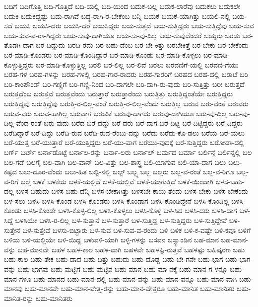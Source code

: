 {ಬದಿಗೆ
ಬದಿಗೊತ್ತಿ
ಬದಿ-ಗೊತ್ತಿದೆ
ಬದಿ-ಯಲ್ಲಿ
ಬದಿ-ಯಿಂದ
ಬದುಕ-ಬಲ್ಲ
ಬದುಕ-ಲಾರೆವು
ಬದುಕಲು
ಬದುಕಲೇ
ಬದುಕಿ
ಬದುಕಿದ್ದಷ್ಟು
ಬದು-ರಾಗಿವೆ
ಬದ್ಧ-ರಾಗಿ-ರ-ಬೇಕೆಂಬ
ಬನ್ನಿ
ಬಯಕೆ
ಬಯಕೆ-ಯಾಗಿತ್ತು
ಬಯಲಿ-ನಲ್ಲಿ
ಬಯ-ಸದೆ
ಬಯಸಿ
ಬಯಸಿ-ದರು
ಬಯಸಿ-ದರೆ
ಬಯಸಿದ್ದರು
ಬಯ-ಸುತ್ತದೆ
ಬಯ-ಸುತ್ತಿದ್ದರು
ಬಯ-ಸುತ್ತಿದ್ದೆವು
ಬಯ-ಸುವ
ಬಯ-ಸುವ-ವ-ರಾ-ಗಿದ್ದರು
ಬಯ-ಸುವು-ದಾಗಿಯೂ
ಬಯ-ಸು-ವು-ದಿಲ್ಲ
ಬಯ-ಸುವುದೆಂದರೆ
ಬಯ್ದರು
ಬರಡು
ಬರ-ತೊಡಗಿ-ದಾಗ
ಬರ-ದಿದ್ದುದು
ಬರದಿ-ರದು
ಬರ-ಬಹು-ದೆಂಬ
ಬರ-ಬೇ-ಕಿತ್ತು
ಬರಬೇಕಿತ್ತೆ
ಬರ-ಬೇಕು
ಬರ-ಬೇಕೆಂದು
ಬರ-ಮಾಡಿ-ಕೊಂಡರು
ಬರ-ಮಾಡಿ-ಕೊಂಡಿದ್ದಾರೆ
ಬರ-ಮಾಡಿ-ಕೊಂಡು
ಬರ-ಮಾಡಿ-ಕೊಳ್ಳಲು
ಬರ-ಮಾಡಿ-ಕೊಳ್ಳುತ್ತಿದ್ದರು
ಬರ-ಮಾಡಿ-ಕೊಳ್ಳುತ್ತಿಲ್ಲ
ಬರಲಿ
ಬರ-ಲಿಲ್ಲ
ಬರ-ಲಿವೆ
ಬರಲು
ಬರವಣಿಗೆ-ಯಲ್ಲಿ
ಬರವಣಿ-ಗೆಯು
ಬರಹ-ಗಳ
ಬರಹ-ಗಳನ್ನು
ಬರಹ-ಗಳಲ್ಲಿ
ಬರಹ-ಗಾರ-ರಾದರು
ಬರಹ-ಗಾರರಿಗೆ
ಬರಹದ
ಬರಹ-ದಲ್ಲಿ
ಬರಾಟೆ
ಬರಿ
ಬರಿ-ಕಾಂಪೌಂಡ್
ಬರಿ-ಗಣ್ಣಿಗೆ
ಬರಿ-ಗಣ್ಣಿ-ನಿಂದ
ಬರಿ-ದಾಗಲೇ
ಬರಿ-ದಾಗಿ-ರು-ವುದು
ಬರಿ-ಸುತ್ತಿತ್ತು
ಬರೀ
ಬರುತ್ತದೆ
ಬರುತ್ತದೆಂಬ
ಬರುತ್ತವೆ
ಬರುತ್ತವೆಂದು
ಬರುತ್ತಾರೆ
ಬರುತ್ತಾರೆಂದು
ಬರುತ್ತಿತ್ತು
ಬರುತ್ತಿದ್ದಂತೆಯೇ
ಬರುತ್ತಿದ್ದರು
ಬರುತ್ತಿದ್ದವು
ಬರುತ್ತಿದ್ದೆವು
ಬರುತ್ತಿ-ರ-ಲಿಲ್ಲ-ವಂತೆ
ಬರುತ್ತಿ-ರ-ಲಿಲ್ಲ-ವೆಂದು
ಬರುತ್ತಿಲ್ಲ
ಬರುವ
ಬರು-ವಂತೆ
ಬರುವರು
ಬರುವ-ವರು
ಬರುವ-ಹಾಗಿಲ್ಲ
ಬರುವಾಗ
ಬರುವಿಕೆ
ಬರುವು-ದಾಗದು
ಬರುವು-ದಾಗಿಯೂ
ಬರು-ವು-ದಿಲ್ಲ
ಬರು-ವು-ದಿಲ್ಲ-ವೆಂದ-ರಂತೆ
ಬರು-ವುದು
ಬರೆದ
ಬರೆ-ದದ್ದು
ಬರೆ-ದರು
ಬರೆ-ದಾಗ
ಬರೆ-ದಿಟ್ಟ
ಬರೆ-ದಿಟ್ಟಿದ್ದರು
ಬರೆ-ದಿದ್ದರು
ಬರೆದಿದ್ದಾರೆ
ಬರೆ-ದಿದ್ದು
ಬರೆದಿ-ರುವ
ಬರೆದಿ-ರುವ-ರೆಂಬು-ದನ್ನು
ಬರೆದು
ಬರೆದು-ಕೊ-ಡಲು
ಬರೆಯ
ಬರೆ-ಯಲು
ಬರೆ-ಯುತ್ತ
ಬರೆ-ಯುತ್ತಾರೆ
ಬರೆ-ಯುತ್ತಿದ್ದರು
ಬರೆ-ಯು-ವಾಗ
ಬರೆಯು-ವುದಕ್ಕೆ
ಬರೆ-ಸುತ್ತಿದ್ದರು
ಬರೋಡಾ-ದಲ್ಲಿ
ಬರ್ಗ್
ಬರ್ಟ್
ಬರ್ನಾಡೊಟ್ಟೆ
ಬರ್ನಾಲ-ರನ್ನು
ಬರ್ನಾ-ಲರು
ಬರ್ನಾಲ್
ಬರ್ಮದ
ಬರ್ಮಾ
ಬರ್ಲಿನ್ಗೆ
ಬರ್ಲಿನ್ನಲ್ಲಿ
ಬಲ
ಬಲ-ಗಡೆ
ಬಲಗೈ
ಬಲ-ವಾಗಿ
ಬಲ-ವಾನ್
ಬಲ-ವಿತ್ತು
ಬಲ-ಶಾಸ್ತ್ರ
ಬಲಿ-ಯಾಗುವ
ಬಲಿ-ಯಾ-ದಾಗ
ಬಲು
ಬಲು-ಕಷ್ಟದ
ಬಲು-ದೂರ-ವೆಂದು
ಬಲು-ಹಿತ
ಬಲ್ಬಿ-ನಲ್ಲಿ
ಬಲ್ಬ್
ಬಲ್ಬ್ನ
ಬಲ್ಲ
ಬಲ್ಲರು
ಬಲ್ಲ-ವ-ರಂತೆ
ಬಲ್ಲ-ವ-ರಿಗೂ
ಬಲ್ಲ-ವ-ರಿಗೆ
ಬಲ್ಲೆ
ಬಳಕೆ
ಬಳಕೆಯ
ಬಳಕೆ-ಯಲ್ಲಿದೆ
ಬಳಕೆ-ಯಲ್ಲಿವೆ
ಬಳಕೆ-ಯಾಗುತ್ತಿದೆ
ಬಳಕೆ-ಯಿಂದಾಗಿ
ಬಳಸ-ಬಹು-ದಲ್ಲ
ಬಳಸ-ಬಹುದು
ಬಳಸ-ಬಹು-ದೆನ್ನಿ
ಬಳಸ-ಬೇಕಾಗಿತ್ತು
ಬಳಸಬೇ-ಕಾಯಿ-ತೆಂದು
ಬಳಸ-ಬೇಕು
ಬಳಸ-ಬೇಕೆಂದು
ಬಳ-ಸಲು
ಬಳಸಿ
ಬಳಸಿ-ಕೊಂಡ
ಬಳಸಿ-ಕೊಂಡರು
ಬಳಸಿ-ಕೊಂಡಾಗ
ಬಳಸಿ-ಕೊಂಡಿದ್ದೇನೆ
ಬಳಸಿ-ಕೊಂಡಿಲ್ಲ
ಬಳಸಿ-ಕೊಂಡು
ಬಳಸಿ-ಕೊಂಡೇ
ಬಳಸಿ-ಕೊಳ್ಳ-ಲಿಲ್ಲ
ಬಳಸಿ-ಕೊಳ್ಳಲು
ಬಳಸಿ-ಕೊಳ್ಳಿ
ಬಳ-ಸಿದ
ಬಳಸಿ-ದರು
ಬಳಸಿ-ದಾಗ
ಬಳ-ಸಿದ್ದೆ
ಬಳಸಿಯೇ
ಬಳಸಿ-ರ-ಲಿಲ್ಲ
ಬಳ-ಸುತ್ತಾನೆ
ಬಳ-ಸುತ್ತಾರೆ
ಬಳ-ಸುತ್ತಿದ್ದ
ಬಳ-ಸುತ್ತಿದ್ದರು
ಬಳ-ಸುತ್ತಿದ್ದೇವೆ
ಬಳ-ಸುತ್ತೇನೆ
ಬಳ-ಸುತ್ತೇವೆ
ಬಳಸು-ಬಿಟ್ಟಾರು
ಬಳ-ಸುವ
ಬಳ-ಸುವ-ವ-ರೆಂದು
ಬಳಿ
ಬಳಿಕ
ಬಳಿ-ಕ-ವಷ್ಟೇ
ಬಳಿ-ಕವೂ
ಬಳಿಗೆ
ಬಳಿಯ
ಬಳಿ-ಯಲ್ಲಿಯೇ
ಬಳಿ-ಯಿದ್ದ
ಬಳುವಳಿ-ಯಾಗಿ
ಬಳ್ಳಿ-ಗಳನ್ನು
ಬಸವನ
ಬಸ್ಸ್ಟಾಂಡಿನ
ಬಹ-ಮಾನ
ಬಹ-ಮಾನ-ವನ್ನು
ಬಹ-ಮಾನವೇ
ಬಹಳ
ಬಹಳ-ಕಾಲ
ಬಹಳ-ವಾಗಿ
ಬಹಳವೇ
ಬಹಳಷ್ಟಿ-ರುತ್ತವೆ
ಬಹಳಷ್ಟು
ಬಹಿಷ್ಕರಣ
ಬಹು
ಬಹು-ಕಾಲ
ಬಹು-ತೇಕ
ಬಹು-ದಾದ
ಬಹು-ದಿತ್ತು
ಬಹುದು
ಬಹು-ದೊಡ್ಡ
ಬಹು-ಬೇ-ಗನೇ
ಬಹು-ಭಾಗ
ಬಹು-ಭಾಗ-ವನ್ನು
ಬಹು-ಭಾಗವು
ಬಹು-ಮಟ್ಟಿಗೆ
ಬಹು-ಮಟ್ಟಿನ
ಬಹು-ಮಾನ
ಬಹು-ಮಾ-ನಕ್ಕೆ
ಬಹು-ಮಾನ-ಗ-ಳನ್ನೂ
ಬಹು-ಮಾನ-ಗಳೂ
ಬಹು-ಮಾನದ
ಬಹು-ಮಾನ-ದಲ್ಲಿ
ಬಹು-ಮಾನ-ವನ್ನು
ಬಹು-ಮಾನ-ವನ್ನೂ
ಬಹು-ಮಾನ-ವಾಗಿ
ಬಹು-ಮಾನವು
ಬಹು-ಮಾನವೇ
ಬಹು-ಮಾನ-ವೇತ್ತ-ರನ್ನು
ಬಹು-ಮಾನ-ವೇತ್ತರೂ
ಬಹು-ಮಾನಿತ
ಬಹು-ಮಾನಿತರ
ಬಹು-ಮಾನಿತ-ರನ್ನು
ಬಹು-ಮಾನಿತರು
}
